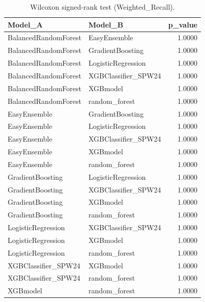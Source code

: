 \begin{table}[t]
\centering
\begin{tabular}{llr}
\toprule
Model_A & Model_B & p_value \\
\midrule
BalancedRandomForest & EasyEnsemble & 1.0000 \\
BalancedRandomForest & GradientBoosting & 1.0000 \\
BalancedRandomForest & LogisticRegression & 1.0000 \\
BalancedRandomForest & XGBClassifier_SPW24 & 1.0000 \\
BalancedRandomForest & XGBmodel & 1.0000 \\
BalancedRandomForest & random_forest & 1.0000 \\
EasyEnsemble & GradientBoosting & 1.0000 \\
EasyEnsemble & LogisticRegression & 1.0000 \\
EasyEnsemble & XGBClassifier_SPW24 & 1.0000 \\
EasyEnsemble & XGBmodel & 1.0000 \\
EasyEnsemble & random_forest & 1.0000 \\
GradientBoosting & LogisticRegression & 1.0000 \\
GradientBoosting & XGBClassifier_SPW24 & 1.0000 \\
GradientBoosting & XGBmodel & 1.0000 \\
GradientBoosting & random_forest & 1.0000 \\
LogisticRegression & XGBClassifier_SPW24 & 1.0000 \\
LogisticRegression & XGBmodel & 1.0000 \\
LogisticRegression & random_forest & 1.0000 \\
XGBClassifier_SPW24 & XGBmodel & 1.0000 \\
XGBClassifier_SPW24 & random_forest & 1.0000 \\
XGBmodel & random_forest & 1.0000 \\
\bottomrule
\end{tabular}
\caption{Wilcoxon signed-rank test (Weighted_Recall).}
\label{tab:wilcoxon_Weighted_Recall}
\end{table}